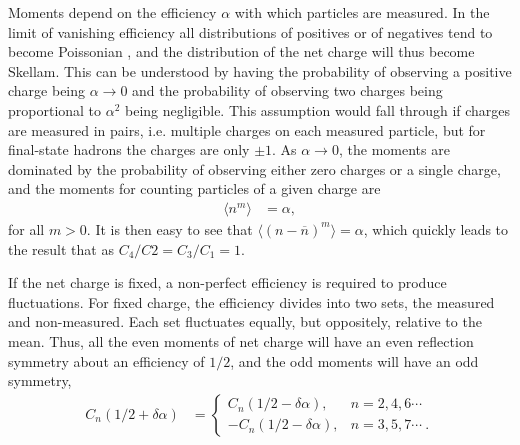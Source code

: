 Moments depend on the efficiency $\alpha$ with which particles are measured. In the limit of vanishing efficiency all distributions of positives or of negatives tend to become Poissonian \cite{Bzdak:2012ab}, and the distribution of the net charge will thus become Skellam.  This can be understood by having the probability of observing a positive charge being $\alpha\rightarrow 0$ and the probability of observing two charges being proportional to $\alpha^2$ being negligible. This assumption would fall through if charges are measured in pairs, i.e. multiple charges on each measured particle, but for final-state hadrons the charges are only $\pm 1$. As $\alpha\rightarrow 0$, the moments are dominated by the probability of observing either zero charges or a single charge, and the moments for counting particles of a given charge are
\begin{eqnarray}
\langle n^m\rangle&=\alpha,
\end{eqnarray}
for all $m>0$. It is then easy to see that $\langle (n-\overline{n})^m\rangle=\alpha$, which quickly leads to the result that as $C_4/C2=C_3/C_1=1$.

If the net charge is fixed, a non-perfect efficiency is required to produce fluctuations. For fixed charge, the efficiency divides into two sets, the measured and non-measured. Each set fluctuates equally, but oppositely, relative to the mean. Thus, all the even moments of net charge will have an even reflection symmetry about an efficiency of $1/2$, and the odd moments will have an odd symmetry,
\begin{eqnarray}
\label{eq:alphasymm}
C_n(1/2+\delta\alpha)&=\left\{\begin{array}{rl}
C_n(1/2-\delta\alpha),&n=2,4,6\cdots\\
-C_n(1/2-\delta\alpha),&n=3,5,7\cdots~.\end{array}\right.
\end{eqnarray}
